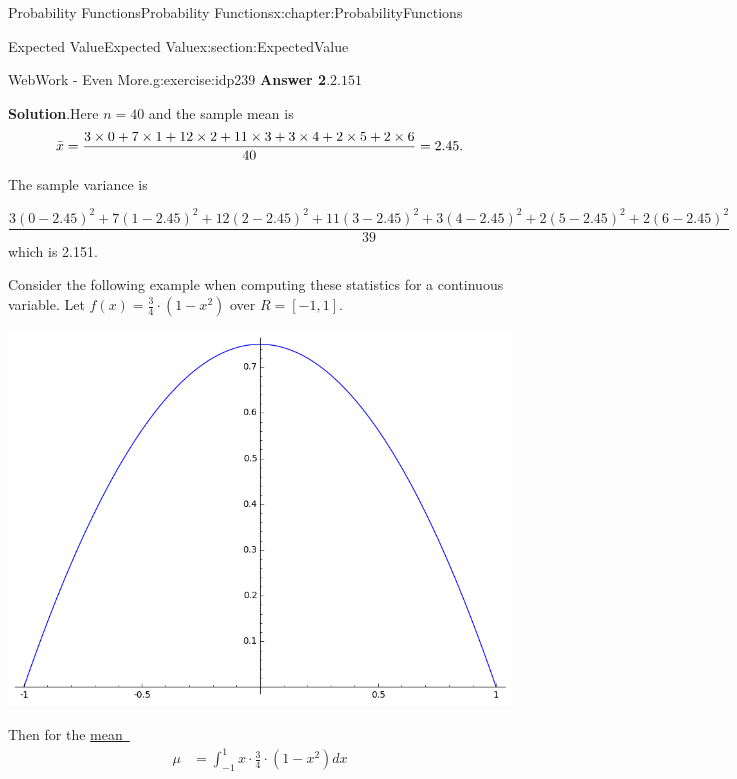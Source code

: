 \documentclass[oneside,10pt,]{book}
\newcommand{\blocktitlefont}{\relax}
\newcommand{\xreffont}{\relax}
\numberwithin{equation}{section}
\begin{document}
\begin{chapterptx}{Probability Functions}{}{Probability Functions}{}{}{x:chapter:ProbabilityFunctions}
\begin{sectionptx}{Expected Value}{}{Expected Value}{}{}{x:section:ExpectedValue}
\begin{inlineexercise}{WebWork - Even More.}{g:exercise:idp239}
\noindent\textbf{\blocktitlefont Answer 2}.\hypertarget{g:answer:idp241}{}\quad{}\(2.151\)%
\par\smallskip%
\noindent\textbf{\blocktitlefont Solution}.\hypertarget{g:solution:idp242}{}\quad{}Here \(n = 40\) and the sample mean is%
\begin{equation*}
\bar{x} = 
\frac{3\times 0 +
7\times 1 +
12\times 2 +
11\times 3 +
3\times 4 +
2\times 5 +
2\times 6}
{40} \\
= 2.45.
\end{equation*}
%
\par
The sample variance is%
\par
%
\begin{equation*}
\frac{3\left( 0 - 2.45 \right) ^{2} +
7\left( 1 - 2.45 \right) ^{2} +
12\left( 2 - 2.45 \right) ^{2} +
11\left( 3 - 2.45 \right) ^{2} +
3\left( 4 - 2.45 \right) ^{2} + 
2\left( 5 - 2.45 \right) ^{2} +
2\left( 6 - 2.45 \right) ^{2}}
{39}
\end{equation*}
which is 2.151.%
\end{inlineexercise}%
Consider the following example when computing these statistics for a continuous variable. Let \(f(x) = \frac{3}{4} \cdot (1-x^2)\) over \(R = [-1,1]\). \begin{image}{0}{1}{0}%
\includegraphics[width=\linewidth]{images/ContinuousDistributionExample.png}
\end{image}%
%
\par
Then for the \hyperlink{x:li:TheoreticalMean}{mean~{\xreffont 1}}%
\begin{align*}
\mu & = \int_{-1}^1 x \cdot \frac{3}{4} \cdot (1-x^2) dx\\

\end{align*}
\end{sectionptx}
\end{chapterptx}
\end{document}
